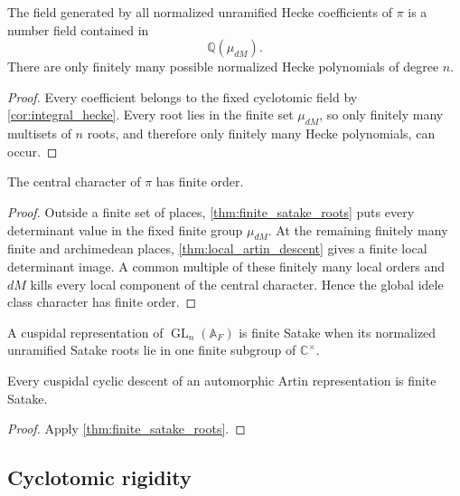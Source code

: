 \documentclass{aomart}
\theoremstyle{definition}
\theoremstyle{remark}
\newcommand{\CC}{\mathbb C}
\newcommand{\QQ}{\mathbb Q}
\newcommand{\Adele}{\mathbb A}
\newcommand{\GL}{\operatorname{GL}}
\begin{document}
\begin{corollary}\label{cor:finite_hecke_field}
The field generated by all normalized unramified Hecke coefficients of \(\pi\) is a number field contained in
\[
 \boxed{
 \QQ(\mu_{dM}).
 }
\]
There are only finitely many possible normalized Hecke polynomials of degree \(n\).
\end{corollary}

\begin{proof}
Every coefficient belongs to the fixed cyclotomic field by \cref{cor:integral_hecke}. Every root lies in the finite set \(\mu_{dM}\), so only finitely many multisets of \(n\) roots, and therefore only finitely many Hecke polynomials, can occur.
\end{proof}

\begin{corollary}\label{cor:finite_central_char}
The central character of \(\pi\) has finite order.
\end{corollary}

\begin{proof}
Outside a finite set of places, \cref{thm:finite_satake_roots} puts every determinant value in the fixed finite group \(\mu_{dM}\). At the remaining finitely many finite and archimedean places, \cref{thm:local_artin_descent} gives a finite local determinant image. A common multiple of these finitely many local orders and \(dM\) kills every local component of the central character. Hence the global idele class character has finite order.
\end{proof}

\begin{definition}\label{def:finite_satake_cusp}
A cuspidal representation of \(\GL_n(\Adele_F)\) is finite Satake when its normalized unramified Satake roots lie in one finite subgroup of \(\CC^\times\).
\end{definition}

\begin{corollary}\label{cor:cyclic_finite_satake}
Every cuspidal cyclic descent of an automorphic Artin representation is finite Satake.
\end{corollary}

\begin{proof}
Apply \cref{thm:finite_satake_roots}.
\end{proof}


\subsection{Cyclotomic rigidity}
\end{document}
